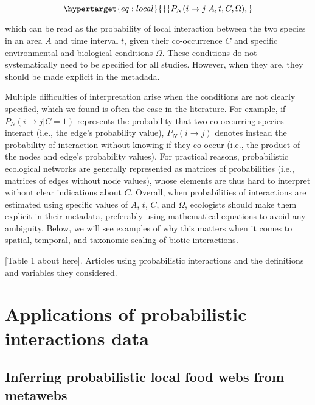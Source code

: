 \documentclass[11pt]{article}
\begin{document}
\begin{equation}\protect\hypertarget{eq:local}{}{P_{N}(i \rightarrow j | A, t, C, \Omega),}\label{eq:local}\end{equation}

which can be read as the probability of local interaction between the
two species in an area \(A\) and time interval \(t\), given their
co-occurrence \(C\) and specific environmental and biological conditions
\(\Omega\). These conditions do not systematically need to be specified
for all studies. However, when they are, they should be made explicit in
the metadada.

Multiple difficulties of interpretation arise when the conditions are
not clearly specified, which we found is often the case in the
literature. For example, if \(P_{N}(i \rightarrow j | C = 1)\)
represents the probability that two co-occurring species interact (i.e.,
the edge's probability value), \(P_{N}(i \rightarrow j)\) denotes
instead the probability of interaction without knowing if they co-occur
(i.e., the product of the nodes and edge's probability values). For
practical reasons, probabilistic ecological networks are generally
represented as matrices of probabilities (i.e., matrices of edges
without node values), whose elements are thus hard to interpret without
clear indications about \(C\). Overall, when probabilities of
interactions are estimated using specific values of \(A\), \(t\), \(C\),
and \(\Omega\), ecologists should make them explicit in their metadata,
preferably using mathematical equations to avoid any ambiguity. Below,
we will see examples of why this matters when it comes to spatial,
temporal, and taxonomic scaling of biotic interactions.

{[}Table 1 about here{]}. Articles using probabilistic interactions and
the definitions and variables they considered.

\hypertarget{applications-of-probabilistic-interactions-data}{%
\section{Applications of probabilistic interactions
data}\label{applications-of-probabilistic-interactions-data}}

\hypertarget{inferring-probabilistic-local-food-webs-from-metawebs}{%
\subsection{Inferring probabilistic local food webs from
metawebs}\label{inferring-probabilistic-local-food-webs-from-metawebs}}
\end{document}
